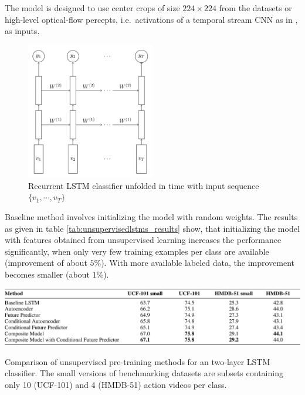 The model is designed to use center crops of size $224 \times 224$ from the datasets or high-level optical-flow percepts, i.e.\ activations of a temporal stream CNN as in \cite{simonyan_two-stream_2014}, as inputs.

\begin{figure}[H]
    \centering
    \includegraphics[width=0.5\textwidth]{img_deep/unsupervisedlstms_classifier}
    \caption{Recurrent LSTM classifier unfolded in time with input sequence $\{v_1, \cdots, v_T\}$ \cite{srivastava_unsupervised_2015}}
    \label{fig:unsupervisedlstms_classifier}
\end{figure}

Baseline method involves initializing the model with random weights.
The results as given in table \ref{tab:unsupervisedlstms_results} show, that initializing the model with features obtained from unsupervised learning increases the performance significantly, when only very few training examples per class are available (improvement of about $5\%$).
With more available labeled data, the improvement becomes smaller (about 1\%).

\begin{table}
    \centering
    \includegraphics[width=\textwidth]{img_deep/unsupervisedlstms_results}
    \caption{Comparison of unsupervised pre-training methods for an two-layer LSTM classifier. The small versions of benchmarking datasets are subsets containing only 10 (UCF-101) and 4 (HMDB-51) action videos per class. \cite{srivastava_unsupervised_2015}}
    \label{tab:unsupervisedlstms_results}
\end{table}

